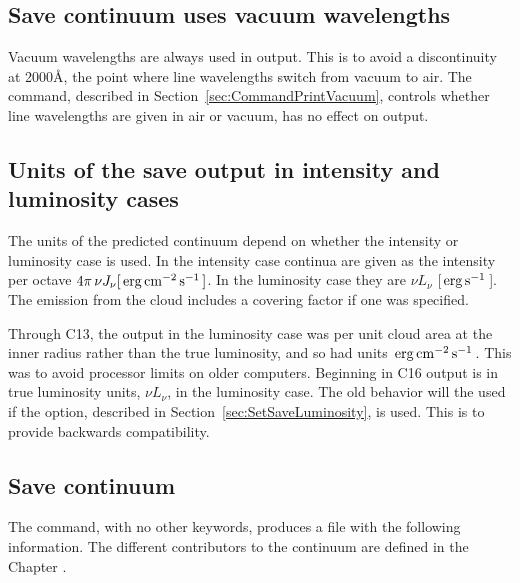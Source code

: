 \subsection{Save continuum uses vacuum wavelengths}
Vacuum wavelengths are always used in  output.
This is to avoid a discontinuity at 2000\AA, the point where line wavelengths switch from
vacuum to air.
The  command, 
described in Section~\ref{sec:CommandPrintVacuum},
controls whether line wavelengths
are given in air or vacuum, has no effect on  output.

\subsection{Units of the save output in intensity and luminosity cases}
The units of the predicted continuum depend on whether the intensity
or luminosity case is used.
In the intensity
case continua are given as the intensity per octave
$ 4\pi \,\nu J_\nu [\mbox{${\rm\thinspace erg}{\rm\thinspace cm}^{-2}{\rm\thinspace s}^{-1}\,$} ]$.
In the luminosity case they are
$\nu L_\nu$
[$\mbox{${\rm\thinspace erg}{\rm\thinspace s}^{-1}\,$} $].
The emission from the cloud includes a covering factor if one was specified.

Through C13, the  output 
in the luminosity case was per unit
cloud area at the inner radius rather than the true luminosity,
and so had units $\mbox{${\rm\thinspace erg}{\rm\thinspace cm}^{-2}{\rm\thinspace s}^{-1}\,$}$.
This was to avoid processor limits on older computers.
Beginning in C16 output is in true luminosity units, $\nu L_\nu$, in the luminosity case.
The old behavior will the used if the
 option, described in
Section~\ref{sec:SetSaveLuminosity}, is used.
This is to provide backwards compatibility.

\subsection{Save continuum}

The  command,
with no other keywords,
produces a file
with the following information.
The different contributors to the continuum
are defined in the Chapter .

